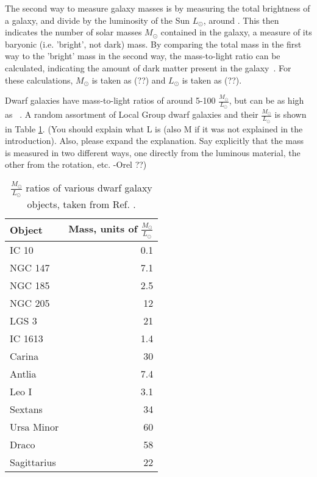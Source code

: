    The second way to measure galaxy masses is by measuring the total brightness of a galaxy, and divide by the luminosity of the Sun $L_\odot$, around .
    This then indicates the number of solar masses $M_\odot$ contained in the galaxy, a measure of its baryonic (i.e. 'bright', not dark) mass.
    By comparing the total mass in the first way to the 'bright' mass in the second way, the mass-to-light ratio can be calculated, indicating the amount of dark matter present in the galaxy~\cite{faber_ml}.
    For these calculations, $M_\odot$ is taken as {\color{red}(??)} and $L_\odot$ is taken as {\color{red}(??)}.
    
    Dwarf galaxies have mass-to-light ratios of around 5-100 $\frac{M_\odot}{L_\odot}$, but can be as high as ~\cite{Simon2007_dwarfgalaxykeck}.
    A random assortment of Local Group dwarf galaxies and their $\frac{M_\odot}{L_\odot}$ is shown in Table \ref{tab:mlratios:dwarfgals}.
    {\color{red}(You should explain what L is (also M if it was not explained in the introduction).  Also, please expand the explanation. Say explicitly that the mass is measured in two different ways, one directly from the luminous material, the other from the rotation, etc. -Orel ??)}
    
    \begin{table}[]
      \centering
      \caption{$\frac{M_\odot}{L_\odot}$ ratios of various dwarf galaxy objects, taken from Ref. \cite{localdwarfs}.}
      \label{tab:mlratios:dwarfgals}
      \begin{tabular}{l r}
        Object      &  Mass, units of $\frac{M_\odot}{L_\odot}$ \\
        \hline
        IC 10       &  0.1 \\
        NGC 147     &  7.1 \\
        NGC 185     &  2.5 \\
        NGC 205     & 12   \\
        LGS 3       & 21   \\
        IC 1613     &  1.4 \\
        Carina      & 30   \\
        Antlia      &  7.4 \\
        Leo I       &  3.1 \\
        Sextans     & 34   \\
        Ursa Minor  & 60   \\
        Draco       & 58   \\
        Sagittarius & 22   \\
      \end{tabular}
    \end{table}
    
